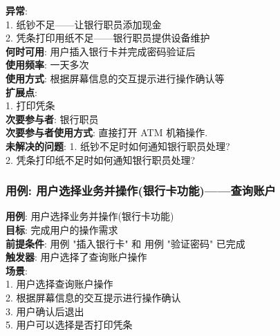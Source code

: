 \documentclass[UTF8]{article}
\begin{document}
\textbf{异常}: \\
	\hspace*{2em} 1. 纸钞不足——让银行职员添加现金 \\
	\hspace*{2em} 2. 凭条打印用纸不足——银行职员提供设备维护 \\
\textbf{何时可用}: 用户插入银行卡并完成密码验证后
\\
\textbf{使用频率}: 一天多次
\\
\textbf{使用方式}: 根据屏幕信息的交互提示进行操作确认等
\\
\textbf{扩展点}: \\
	\hspace*{2em}1. 打印凭条 \\
\textbf{次要参与者}: 银行职员
\\
\textbf{次要参与者使用方式}: 直接打开 ATM 机箱操作.
\\
\textbf{未解决的问题}: 
	\hspace*{2em} 1. 纸钞不足时如何通知银行职员处理? \\
	\hspace*{2em} 2. 凭条打印纸不足时如何通知银行职员处理? \\
		
\subsubsection{用例: 用户选择业务并操作(银行卡功能)——查询账户}
\noindent
\textbf{用例}: 用户选择业务并操作(银行卡功能)
\\
\textbf{目标}: 完成用户的操作需求
\\
\textbf{前提条件}: 用例 "插入银行卡" 和 用例 "验证密码" 已完成
\\
\textbf{触发器}: 用户选择了查询账户操作
\\
\textbf{场景}: \\
	\hspace*{2em}1. 用户选择查询账户操作 \\
	\hspace*{2em}2. 根据屏幕信息的交互提示进行操作确认 \\
	\hspace*{2em}3. 用户确认后退出 \\
	\hspace*{2em} 5. 用户可以选择是否打印凭条 \\
	
\end{document}
